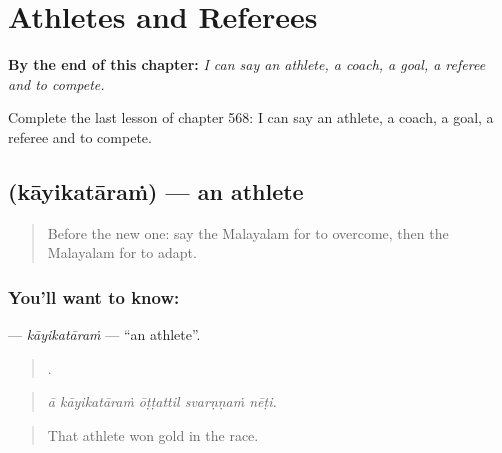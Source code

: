 
\chapter{Athletes and Referees}
\label{ch:ml-athletes-and-referees}

\begin{chapteropening}
\textbf{By the end of this chapter:} \emph{I can say an athlete, a coach, a goal, a referee and to compete.}

Complete the last lesson of chapter 568: I can say an athlete, a coach, a goal, a referee and to compete.
\end{chapteropening}

\section[\texorpdfstring{\ml{കായികതാരം} (kāyikatāraṁ)}{കായികതാരം (kāyikatāraṁ)}]{ (kāyikatāraṁ) — an athlete}

\label{lesson:ML-C568-kayikataram}



\begin{quote}
Before the new one: say the Malayalam for to overcome, then the Malayalam for to adapt.
\end{quote}

\subsection*{You'll want to know: }
\textbf{} — \emph{kāyikatāraṁ} — \textquotedblleft{}an athlete\textquotedblright{}.

\begin{quote}
    .
\end{quote}

\begin{quote}
\emph{ā kāyikatāraṁ ōṭṭattil svarṇṇaṁ nēṭi.}
\end{quote}

\begin{quote}
That athlete won gold in the race.
\end{quote}

